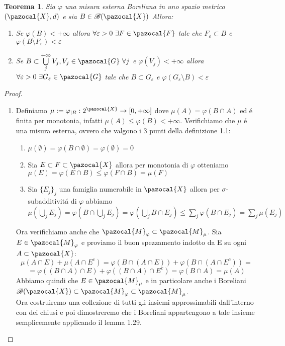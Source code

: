 \documentclass[11pt,a4paper]{report}
\theoremstyle{plain}
\newtheorem{thm}{Teorema}[chapter] %
\theoremstyle{definition}
\newcommand{\M}{\pazocal{M}_\varphi}
\newcommand{\X}{\pazocal{X}}
\newcommand{\F}{\pazocal{F}}
\newcommand{\G}{\pazocal{G}}
\newcommand{\B}{\mathcal{B}}
\begin{document}
\begin{thm}
	Sia $\varphi$ una misura esterna Boreliana in uno spazio metrico $(\X,d)$ e sia $B\in \B(\X)$ Allora:
	\begin{enumerate}
		\item Se $\varphi(B) < +\infty$ allora $\forall \varepsilon>0\ \exists F\in \F$ tale che $F_\varepsilon \subset B$ e $\varphi(B\setminus F_\varepsilon) < \varepsilon$
		\item Se $B \subset \bigcup\limits_{j}^{+\infty}V_j, V_j \in \G \ \forall j$ e $\varphi(V_j) < +\infty$ allora $\forall \varepsilon>0\ \exists G_\varepsilon \in \G$ tale che $B\subset G_\varepsilon$ e $\varphi(G_\varepsilon \setminus B) < \varepsilon$
	\end{enumerate}
\end{thm}
\begin{proof}
	\begin{enumerate}
		\item Definiamo $\mu := \varphi_{|B} : 2^\X \rightarrow [0, +\infty]$ dove $\mu(A) = \varphi(B\cap A)$ ed \'e finita per monotonia, infatti $\mu(A) \le \varphi(B) < +\infty$. Verifichiamo che $\mu$ \'e una misura esterna, ovvero che valgono i 3 punti della definizione 1.1:
		\begin{enumerate}
			\item $\mu(\emptyset) = \varphi(B \cap \emptyset) = \varphi(\emptyset) = 0$
			\item Sia $E\subset F \subset \X$ allora per monotonia di $\varphi$ otteniamo $\mu(E) = \varphi(E \cap B) \le \varphi(F\cap B) = \mu(F)$
			\item Sia $\{E_j\}_j$ una famiglia numerabile in $\X$ allora per $\sigma$-subadditivit\'a di $\varphi$ abbiamo $\mu(\bigcup\limits_jE_j) = \varphi(B \cap \bigcup\limits_jE_j) = \varphi(\bigcup\limits_j B \cap E_j) \le \sum\limits_j\varphi(B\cap E_j) = \sum\limits_j\mu(E_j)$
		\end{enumerate}
		Ora verifichiamo anche che $\M \subset \pazocal{M}_\mu$. Sia $E \in \M$ e proviamo il buon spezzamento indotto da E su ogni $A \subset \X$:
		\[
			\mu(A \cap E) + \mu(A \cap E^c) = \varphi(B \cap (A \cap E)) + \varphi(B \cap (A \cap E^c)) =
		\]
		\[
			= \varphi((B \cap A) \cap E) + \varphi((B \cap A) \cap E^c) = \varphi(B \cap A) = \mu(A)
		\]
		Abbiamo quindi che $E \in \pazocal{M}_\mu$ e in particolare anche i Boreliani $\B(\X) \subset \M \subset \pazocal{M}_\mu$.\\ Ora costruiremo una collezione di tutti gli insiemi approssimabili dall'interno con dei chiusi e poi dimostreremo che i Boreliani appartengono a tale insieme semplicemente applicando il lemma 1.29.

\end{enumerate}
\end{proof}
\end{document}
